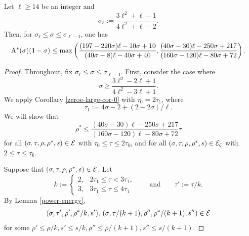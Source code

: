 \begin{theorem}\label{ze-jutila-thm}
Let $\ell \ge 14$ be an integer and 
\[
\sigma_{\ell} := \frac{3\ell^2 + \ell - 1}{4\ell^2 + \ell - 2}.
\]
Then, for $\sigma_{\ell} \le \sigma \le \sigma_{\ell - 1}$, one has 
\[
\mathrm{A}^*(\sigma)(1 - \sigma) \le \max\left(\frac{(197 - 220\sigma)\ell - 10\sigma + 10}{(40\sigma - 8)\ell - 40\sigma + 40}, \frac{(40\sigma - 30)\ell - 250\sigma + 217}{(160\sigma - 120)\ell - 80\sigma + 72}\right).
\]
\end{theorem}
\begin{proof}
Throughout, fix $\sigma_{\ell} \le \sigma \le \sigma_{\ell - 1}$. First, consider the case where 
\begin{equation}\label{ze-jutila-sigma-assump1}
\sigma \ge \frac{3\ell^2 - 2\ell + 1}{4\ell^2 - 3\ell + 1}.
\end{equation}
We apply Corollary \ref{zeroe-large-cor-0} with $\tau_0 = 2\tau_1$, where  
\[
\tau_1 := 4\sigma - 2 + (2-2\sigma)/\ell.
\]
We will show that 
\[
\rho^* \le \frac{(40\sigma - 30)\ell - 250\sigma + 217}{(160\sigma - 120)\ell - 80\sigma + 72}\tau
\]
for all $(\sigma, \tau, \rho, \rho^*, s) \in \mathcal{E}$ with $\tau_0 \le \tau \le 2\tau_0$, and for all $(\sigma, \tau, \rho, \rho^*, s) \in \mathcal{E}_\zeta$ with $2 \le \tau \le \tau_0$. 

Suppose that $(\sigma, \tau, \rho, \rho^*, s) \in \mathcal{E}$. Let 
\[
k := \begin{cases}
2,& 2\tau_1 \le \tau < 3\tau_1,\\
3,& 3\tau_1 \le \tau \le 4\tau_1
\end{cases}\qquad \text{and} \qquad \tau' := \tau/k.
\]
By Lemma \ref{power-energy},
\begin{equation}\label{ze-lem-tuples}
(\sigma, \tau', \rho', \rho^*/k, s'),\, (\sigma, \tau/(k + 1), \rho'', \rho^*/(k + 1), s'') \in \mathcal{E}
\end{equation}
for some $\rho' \le \rho/k, s' \le s/k, \rho'' \le \rho/(k+1), s'' \le s/(k+1)$.


\end{proof}
